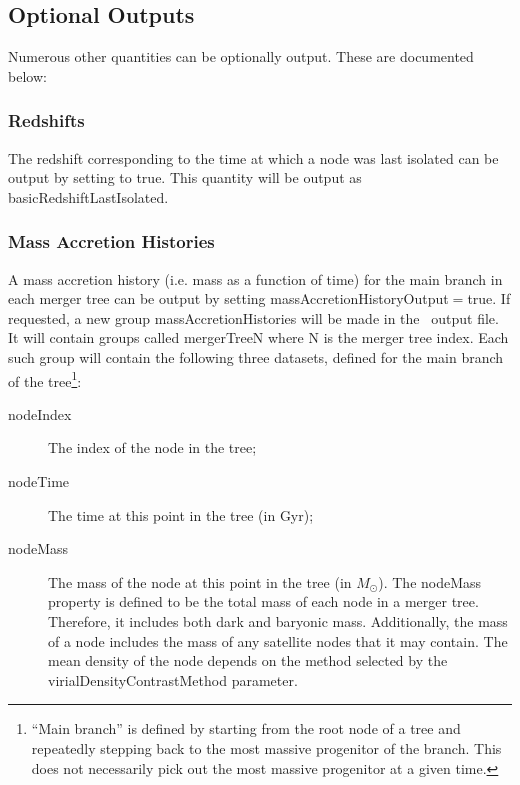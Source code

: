 \subsection{Optional Outputs}

Numerous other quantities can be optionally output. These are documented below:

\subsubsection{Redshifts}

The redshift corresponding to the time at which a node was last isolated can be output by setting {\normalfont \ttfamily [outputNodeRedshifts]} to {\normalfont \ttfamily true}. This quantity will be output as {\normalfont \ttfamily basicRedshiftLastIsolated}.

\subsubsection{Mass Accretion Histories}

A mass accretion history (i.e. mass as a function of time) for the main branch in each merger tree can be output by setting {\normalfont \ttfamily massAccretionHistoryOutput}$=${\normalfont \ttfamily true}. If requested, a new group {\normalfont \ttfamily massAccretionHistories} will be made in the \glc\ output file. It will contain groups called {\normalfont \ttfamily mergerTreeN} where {\normalfont \ttfamily N} is the merger tree index. Each such group will contain the following three datasets, defined for the main branch of the tree\footnote{``Main branch'' is defined by starting from the root node of a tree and repeatedly stepping back to the most massive progenitor of the branch. This does not necessarily pick out the most massive progenitor at a given time.}:
\begin{description}
 \item [{\normalfont \ttfamily nodeIndex}] The index of the node in the tree;
 \item [{\normalfont \ttfamily nodeTime}] The time at this point in the tree (in Gyr);
 \item [{\normalfont \ttfamily nodeMass}] The mass of the node at this point in the tree (in $M_\odot$). The {\normalfont \ttfamily nodeMass} property is defined to be the total mass of each node in a merger tree. Therefore, it includes both dark and baryonic mass. Additionally, the mass of a node includes the mass of any satellite nodes that it may contain. The mean density of the node depends on the method selected by the {\normalfont \ttfamily virialDensityContrastMethod} parameter.
\end{description}

